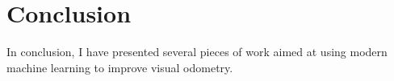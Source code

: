 \chapter{Conclusion}
In conclusion, I have presented several pieces of work aimed at using modern machine learning to improve visual odometry.